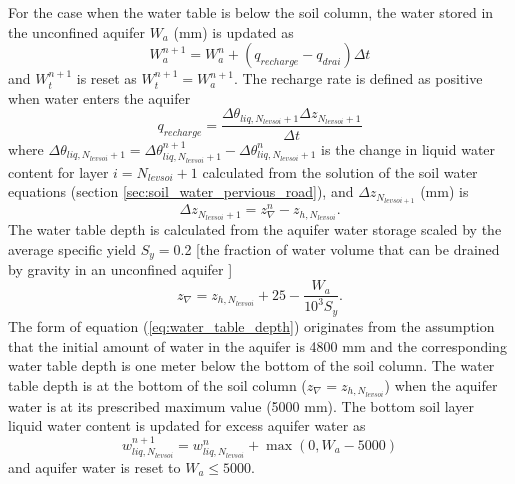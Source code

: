 \documentclass[12pt,authoryear]{elsarticle}
\numberwithin{equation}{section} %
\begin{document}
For the case when the water table is below the soil column, the water stored in the unconfined aquifer $W_{a}$ (mm) is updated as
\begin{equation}
W_{a}^{n+1} = W_{a}^{n}+(q_{recharge}-q_{drai})\Delta t
\end{equation}
and $W_{t}^{n+1}$ is reset as $W_{t}^{n+1}=W_{a}^{n+1}$. The recharge rate is defined as positive when water enters the aquifer
\begin{equation}
q_{recharge}=\frac{\Delta \theta_{liq,N_{levsoi}+1}\Delta z_{N_{levsoi}+1}}{\Delta t}
\end{equation}
where $\Delta \theta_{liq,N_{levsoi}+1}=\Delta \theta_{liq,N_{levsoi}+1}^{n+1}-\Delta \theta_{liq,N_{levsoi}+1}^{n}$ is the change in liquid water content for layer $i=N_{levsoi}+1$ calculated from the solution of the soil water equations (section \ref{sec:soil_water_pervious_road}), and $\Delta z_{N_{levsoi+1}}$ (mm) is
\begin{equation}
\Delta z_{N_{levsoi}+1}=z_{\nabla}^{n}-z_{h,N_{levsoi}}.
\end{equation}
The water table depth is calculated from the aquifer water storage scaled by the average
specific yield $S_{y}=$0.2 [the fraction of water volume that can be drained by gravity in an
unconfined aquifer \citep{niuDevelopmentSimpleGroundwater2007}]
\begin{equation}
\label{eq:water_table_depth}
z_{\nabla}=z_{h,N_{levsoi}}+25-\frac{W_{a}}{10^{3}S_{y}}.
\end{equation}
The form of equation (\ref{eq:water_table_depth}) originates from the assumption that the initial amount of water in the aquifer is 4800 mm and the corresponding water table depth is one meter below the bottom of the soil column. The water table depth is at the bottom of the soil column ($z_{\nabla}=z_{h,N_{levsoi}}$) when the aquifer water is at its prescribed maximum value (5000 mm). The bottom soil layer liquid water content is updated for excess aquifer water as
\begin{equation}
w_{liq,N_{levsoi}}^{n+1} = w_{liq,N_{levsoi}}^{n}+\max(0,W_{a}-5000)
\end{equation}
and aquifer water is reset to $W_{a}\leq5000$.
\end{document}
